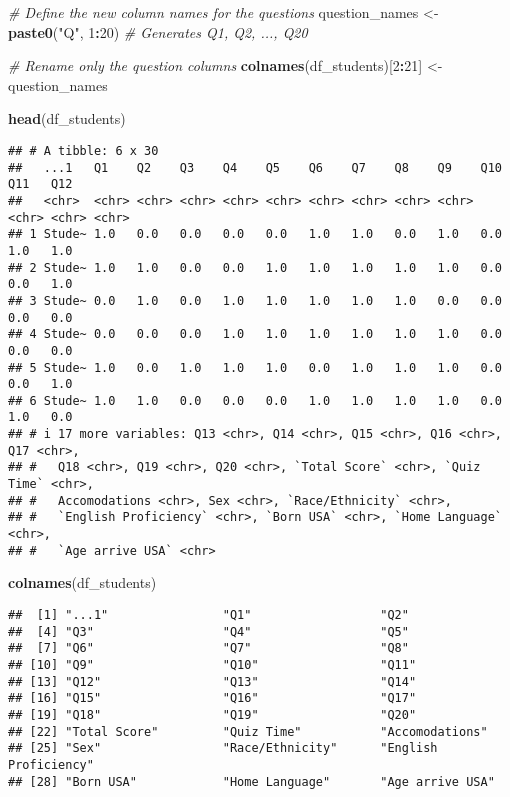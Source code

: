 \documentclass[
]{article}
\newenvironment{Shaded}{\begin{snugshade}}{\end{snugshade}}
\newcommand{\CommentTok}[1]{\textcolor[rgb]{0.56,0.35,0.01}{\textit{#1}}}
\newcommand{\DecValTok}[1]{\textcolor[rgb]{0.00,0.00,0.81}{#1}}
\newcommand{\FunctionTok}[1]{\textcolor[rgb]{0.13,0.29,0.53}{\textbf{#1}}}
\newcommand{\NormalTok}[1]{#1}
\newcommand{\OtherTok}[1]{\textcolor[rgb]{0.56,0.35,0.01}{#1}}
\newcommand{\SpecialCharTok}[1]{\textcolor[rgb]{0.81,0.36,0.00}{\textbf{#1}}}
\newcommand{\StringTok}[1]{\textcolor[rgb]{0.31,0.60,0.02}{#1}}
\begin{document}
\begin{Shaded}
\begin{Highlighting}[]
\CommentTok{\# Define the new column names for the questions}
\NormalTok{question\_names }\OtherTok{\textless{}{-}} \FunctionTok{paste0}\NormalTok{(}\StringTok{"Q"}\NormalTok{, }\DecValTok{1}\SpecialCharTok{:}\DecValTok{20}\NormalTok{)  }\CommentTok{\# Generates Q1, Q2, ..., Q20}

\CommentTok{\# Rename only the question columns}
\FunctionTok{colnames}\NormalTok{(df\_students)[}\DecValTok{2}\SpecialCharTok{:}\DecValTok{21}\NormalTok{] }\OtherTok{\textless{}{-}}\NormalTok{ question\_names}

\FunctionTok{head}\NormalTok{(df\_students)}
\end{Highlighting}
\end{Shaded}

\begin{verbatim}
## # A tibble: 6 x 30
##   ...1   Q1    Q2    Q3    Q4    Q5    Q6    Q7    Q8    Q9    Q10   Q11   Q12  
##   <chr>  <chr> <chr> <chr> <chr> <chr> <chr> <chr> <chr> <chr> <chr> <chr> <chr>
## 1 Stude~ 1.0   0.0   0.0   0.0   0.0   1.0   1.0   0.0   1.0   0.0   1.0   1.0  
## 2 Stude~ 1.0   1.0   0.0   0.0   1.0   1.0   1.0   1.0   1.0   0.0   0.0   1.0  
## 3 Stude~ 0.0   1.0   0.0   1.0   1.0   1.0   1.0   1.0   0.0   0.0   0.0   0.0  
## 4 Stude~ 0.0   0.0   0.0   1.0   1.0   1.0   1.0   1.0   1.0   0.0   0.0   0.0  
## 5 Stude~ 1.0   0.0   1.0   1.0   1.0   0.0   1.0   1.0   1.0   0.0   0.0   1.0  
## 6 Stude~ 1.0   1.0   0.0   0.0   0.0   1.0   1.0   1.0   1.0   0.0   1.0   0.0  
## # i 17 more variables: Q13 <chr>, Q14 <chr>, Q15 <chr>, Q16 <chr>, Q17 <chr>,
## #   Q18 <chr>, Q19 <chr>, Q20 <chr>, `Total Score` <chr>, `Quiz Time` <chr>,
## #   Accomodations <chr>, Sex <chr>, `Race/Ethnicity` <chr>,
## #   `English Proficiency` <chr>, `Born USA` <chr>, `Home Language` <chr>,
## #   `Age arrive USA` <chr>
\end{verbatim}

\begin{Shaded}
\begin{Highlighting}[]
\FunctionTok{colnames}\NormalTok{(df\_students)}
\end{Highlighting}
\end{Shaded}

\begin{verbatim}
##  [1] "...1"                "Q1"                  "Q2"                 
##  [4] "Q3"                  "Q4"                  "Q5"                 
##  [7] "Q6"                  "Q7"                  "Q8"                 
## [10] "Q9"                  "Q10"                 "Q11"                
## [13] "Q12"                 "Q13"                 "Q14"                
## [16] "Q15"                 "Q16"                 "Q17"                
## [19] "Q18"                 "Q19"                 "Q20"                
## [22] "Total Score"         "Quiz Time"           "Accomodations"      
## [25] "Sex"                 "Race/Ethnicity"      "English Proficiency"
## [28] "Born USA"            "Home Language"       "Age arrive USA"
\end{verbatim}
\end{document}

